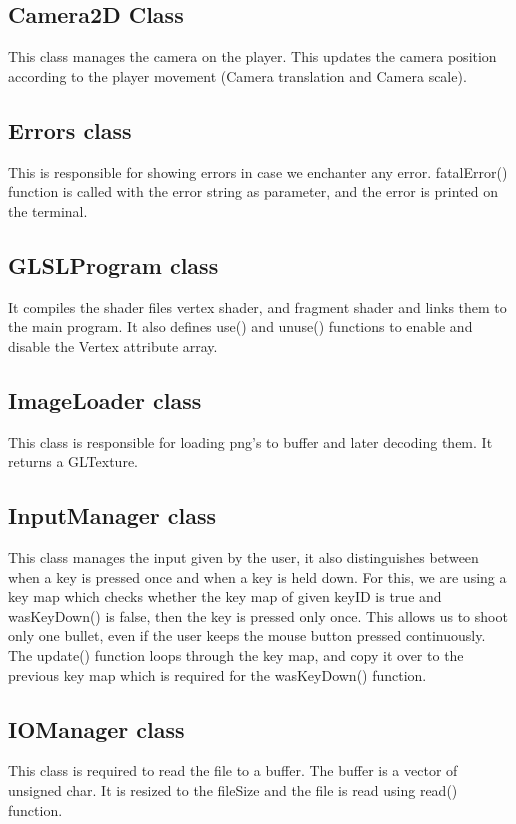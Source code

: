 \documentclass{article}
\begin{document}
\subsection{Camera2D Class}
This class manages the camera on the player. This updates the camera position according to the player movement (Camera translation and Camera scale).
 \newline

\subsection{Errors class}
This is responsible for showing errors in case we enchanter any error. fatalError() function is called with the error string as parameter, and the error is printed on the terminal. \newline

\subsection{GLSLProgram class}
It compiles the shader files vertex shader, and fragment shader and links them to the main program. It also defines use() and unuse() functions to enable and disable the Vertex attribute array. 
\newline

\subsection{ImageLoader class}
This class is responsible for loading png’s to buffer and later decoding them. It returns a GLTexture.
\newline

\subsection{InputManager class}
This class manages the input given by the user, it also distinguishes between when a key is pressed once and when a key is held down. For this, we are using a key map which checks whether the key map of given keyID is true and wasKeyDown() is false, then the key is pressed only once. This allows us to shoot only one bullet, even if the user keeps the mouse button pressed continuously. The update() function loops through the key map, and copy it over to the previous key map which is required for the wasKeyDown() function.
\newline

\subsection{IOManager class}
This class is required to read the file to a buffer. The buffer is a vector of unsigned char. It is resized to the fileSize and the file is read using read() function.
\newline
\end{document}

